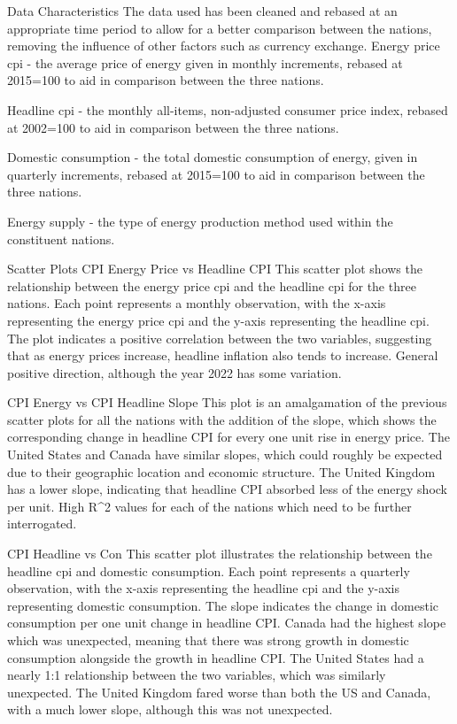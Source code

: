 Data Characteristics
The data used has been cleaned and rebased at an appropriate time period to allow for a better comparison between the nations, removing the influence of other factors such as currency exchange.
Energy price cpi - the average price of energy given in monthly increments, rebased at 2015=100 to aid in comparison between the three nations.

Headline cpi - the monthly all-items, non-adjusted consumer price index, rebased at 2002=100 to aid in comparison between the three nations.

Domestic consumption - the total domestic consumption of energy, given in quarterly increments, rebased at 2015=100 to aid in comparison between the three nations.

Energy supply - the type of energy production method used within the constituent nations.

Scatter Plots
CPI Energy Price vs Headline CPI
This scatter plot shows the relationship between the energy price cpi and the headline cpi for the three nations. Each point represents a monthly observation, with the x-axis representing the energy price cpi and the y-axis representing the headline cpi. 
The plot indicates a positive correlation between the two variables, suggesting that as energy prices increase, headline inflation also tends to increase.
General positive direction, although the year 2022 has some variation.

CPI Energy vs CPI Headline Slope
This plot is an amalgamation of the previous scatter plots for all the nations with the addition of the slope, which shows the corresponding change in headline CPI for every one unit rise in energy price.
The United States and Canada have similar slopes, which could roughly be expected due to their geographic location and economic structure.
The United Kingdom has a lower slope, indicating that headline CPI absorbed less of the energy shock per unit.
High R^2 values for each of the nations which need to be further interrogated. 

CPI Headline vs Con
This scatter plot illustrates the relationship between the headline cpi and domestic consumption. Each point represents a quarterly observation, with the x-axis representing the headline cpi and the y-axis representing domestic consumption.
The slope indicates the change in domestic consumption per one unit change in headline CPI.
Canada had the highest slope which was unexpected, meaning that there was strong growth in domestic consumption alongside the growth in headline CPI.
The United States had a nearly 1:1 relationship between the two variables, which was similarly unexpected.
The United Kingdom fared worse than both the US and Canada, with a much lower slope, although this was not unexpected.

